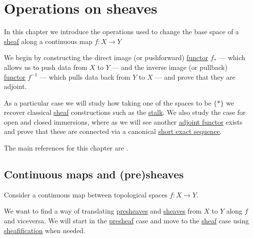 \documentclass[../../main]{subfiles}
\begin{document}
\chapter{Operations on sheaves}\label{ch:operations-on-sheaves}

In this chapter we introduce the operations used to change the base space of a \hyperref[def:sheaf]{sheaf} along a continuous map \(f\colon X \to Y\)

We begin by constructing the direct image (or pushforward) \hyperref[def:functor]{functor} \(f_{\ast}\) --- which allows us to push data from \(X\) to \(Y\) --- and the inverse image (or pullback) \hyperref[def:functor]{functor} \(f^{-1}\) --- which pulls data back from \(Y\) to \(X\) --- and prove that they are adjoint.

As a particular case we will study how taking one of the spaces to be \(\{\ast\}\) we recover classical \hyperref[def:sheaf]{sheaf} constructions such as the \hyperref[def:stalk]{stalk}.
We also study the case for open and closed immersions, where as we will see another \hyperref[def:adjoint-functors]{adjoint functor} exists and prove that these are connected via a canonical \hyperref[def:exact-sequence]{short exact sequence}.

The main references for this chapter are \cite{stacks-project, kashiwaraSheavesManifolds1990}.

\section{Continuous maps and (pre)sheaves}\label{sec:continuous-maps-sheaves}

Consider a continuous map between topological spaces \(f\colon X \to Y\).

We want to find a way of translating \hyperref[def:presheaf]{presheaves} and \hyperref[def:sheaf]{sheaves} from \(X\) to \(Y\) along \(f\) and viceversa.
We will start in the \hyperref[def:presheaf]{presheaf} case and move to the \hyperref[def:sheaf]{sheaf} case using \hyperref[def:sheafification]{sheafification} when needed.
\end{document}
